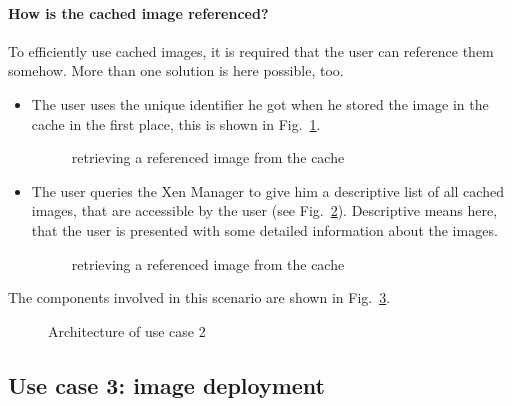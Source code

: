 \paragraph{How is the cached image referenced?} To efficiently use cached
images, it is required that the user can reference them somehow. More than
one solution is here possible, too.
\begin{itemize}
\item The user uses the unique  identifier he got when he stored the image
  in   the    cache   in   the    first   place,   this   is    shown   in
  Fig.~\ref{fig:seq-image-caching-3}.
  \begin{figure}[htbp]
    \begin{center}
    \end{center}
    \caption[Image referencing]{retrieving a referenced image from the cache}
    \label{fig:seq-image-caching-3}
  \end{figure}
\item The user  queries the Xen Manager to give him  a descriptive list of
  all   cached   images,   that   are   accessible  by   the   user   (see
  Fig.~\ref{fig:seq-image-caching-4}).   Descriptive means here,  that the
  user is presented with some detailed information about the images.
  \begin{figure}[htbp]
    \begin{center}
    \end{center}
    \caption[Image referencing]{retrieving a referenced image from the cache}
    \label{fig:seq-image-caching-4}
  \end{figure}
\end{itemize}

The    components   involved    in    this   scenario    are   shown    in
Fig.~\ref{fig:arch-referencing-images-1}.
\begin{figure}[htbp]
  \begin{center}
  \end{center}
  \caption{Architecture of use case 2}
  \label{fig:arch-referencing-images-1}
\end{figure}


\subsection{Use case 3: image deployment}

